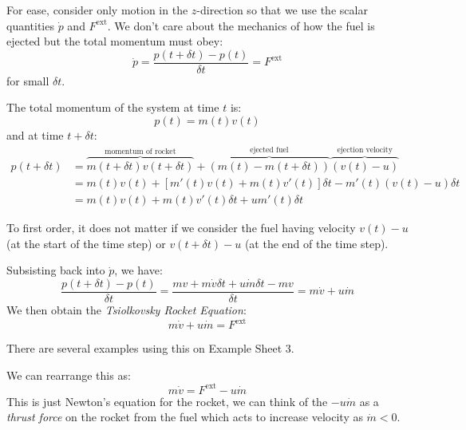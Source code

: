 \documentclass[../main.tex]{subfiles}
\begin{document}
For ease, consider only motion in the $z$-direction so that we use the scalar quantities $\dot{p}$ and $F^{\text{ext}}$.
We don't care about the mechanics of how the fuel is ejected but the total momentum must obey:
\[
  \dot{p} = \frac{p(t + \delta t) - p(t)}{\delta t} = F^{\text{ext}}
\]
for small $\delta t$.

The total momentum of the system at time $t$ is:
\[
  p(t) = m(t) v(t)
\]
and at time $t + \delta t$:
\begin{align*}
  p(t + \delta t) &= \overbrace{m(t + \delta t)v(t + \delta t)}^{\text{momentum of rocket}} + \overbrace{(m(t) - m(t + \delta t))}^{\text{ejected fuel}}\overbrace{(v(t) - u)}^{\text{ejection velocity}} \\
                  &= m(t)v(t) + [m'(t)v(t) + m(t)v'(t)] \delta t - m'(t)(v(t) - u) \delta t \\
                  &= m(t)v(t) + m(t)v'(t)\delta t + um'(t)\delta t
\end{align*}
\begin{remark}[Note]
  To first order, it does not matter if we consider the fuel having velocity $v(t) - u$ (at the start of the time step) or $v(t + \delta t) - u$ (at the end of the time step).
\end{remark}
Subsisting back into $\dot{p}$, we have:
\[
  \frac{p(t + \delta t) - p(t)}{\delta t} = \frac{mv + m\dot{v}\delta t + u\dot{m}\delta t - mv}{\delta t} = m\dot{v} + u\dot{m}
\]
We then obtain the \textit{Tsiolkovsky Rocket Equation}:
\[
  m \dot{v} + u \dot{m} = F^{\text{ext}}
\]
\begin{remark}[Note]
  There are several examples using this on Example Sheet 3.
\end{remark}

We can rearrange this as:
\[
  m \dot{v} = F^{\text{ext}} - u\dot{m}
\]
This is just Newton's equation for the rocket, we can think of the $-u\dot{m}$ as a \textit{thrust force} on the rocket from the fuel which acts to increase velocity as $\dot{m} < 0$.
\end{document}
